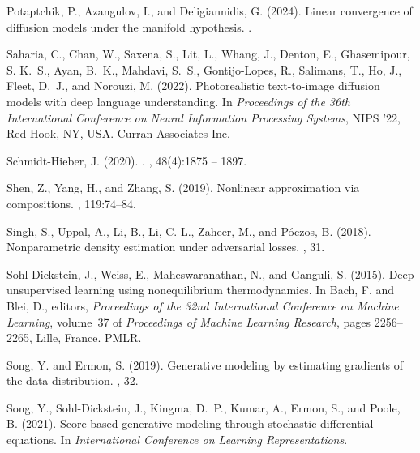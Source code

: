 \documentclass[12pts]{article}
\begin{document}
\begin{thebibliography}{}
Potaptchik, P., Azangulov, I., and Deligiannidis, G. (2024).
\newblock Linear convergence of diffusion models under the manifold hypothesis.
.

Saharia, C., Chan, W., Saxena, S., Lit, L., Whang, J., Denton, E., Ghasemipour, S. K.~S., Ayan, B.~K., Mahdavi, S.~S., Gontijo-Lopes, R., Salimans, T., Ho, J., Fleet, D.~J., and Norouzi, M. (2022).
\newblock Photorealistic text-to-image diffusion models with deep language understanding.
\newblock In {\em Proceedings of the 36th International Conference on Neural Information Processing Systems}, NIPS '22, Red Hook, NY, USA. Curran Associates Inc.

Schmidt-Hieber, J. (2020).
.
, 48(4):1875 -- 1897.

Shen, Z., Yang, H., and Zhang, S. (2019).
\newblock Nonlinear approximation via compositions.
, 119:74--84.

Singh, S., Uppal, A., Li, B., Li, C.-L., Zaheer, M., and P{\'o}czos, B. (2018).
\newblock Nonparametric density estimation under adversarial losses.
, 31.

Sohl-Dickstein, J., Weiss, E., Maheswaranathan, N., and Ganguli, S. (2015).
\newblock Deep unsupervised learning using nonequilibrium thermodynamics.
\newblock In Bach, F. and Blei, D., editors, {\em Proceedings of the 32nd International Conference on Machine Learning}, volume~37 of {\em Proceedings of Machine Learning Research}, pages 2256--2265, Lille, France. PMLR.

Song, Y. and Ermon, S. (2019).
\newblock Generative modeling by estimating gradients of the data distribution.
, 32.

Song, Y., Sohl-Dickstein, J., Kingma, D.~P., Kumar, A., Ermon, S., and Poole, B. (2021).
\newblock Score-based generative modeling through stochastic differential equations.
\newblock In {\em International Conference on Learning Representations}.


\end{thebibliography}
\end{document}
